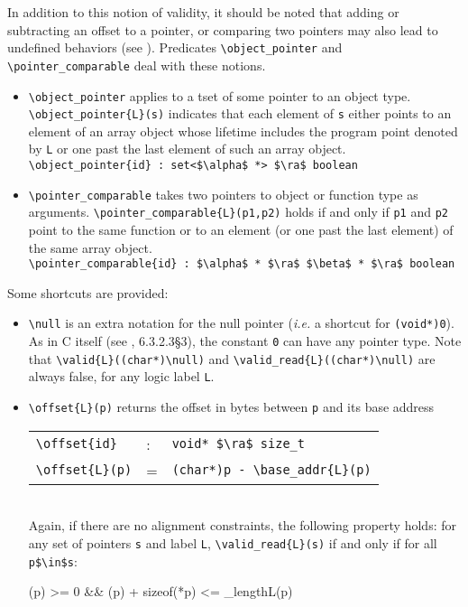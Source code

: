 In addition to this notion of validity, it should be noted that
adding or subtracting an offset to a pointer, or comparing two pointers
may also lead to undefined behaviors (see \cite[6.5.6 and 6.5.8]{standardc99}).
Predicates \lstinline|\object_pointer| and \lstinline|\pointer_comparable|
deal with these notions.
\begin{itemize}
\item \lstinline|\object_pointer| applies to a tset of
some pointer to an object type. \lstinline|\object_pointer{L}(s)| indicates that
each element of \lstinline|s| either points to an element of an array object
whose lifetime includes the program point denoted by \lstinline|L| or one past
the last element of such an array object.
\\ \makebox[5mm]{} \lstinline|\object_pointer{id} : set<$\alpha$ *> $\ra$ boolean|
\item \lstinline|\pointer_comparable| takes two pointers
to object or function type as arguments.
\lstinline|\pointer_comparable{L}(p1,p2)| holds if and only if \lstinline|p1|
and \lstinline|p2| point to the same function or to an element (or one past
the last element) of the same array object.
\\ \makebox[5mm]{} \lstinline|\pointer_comparable{id} : $\alpha$ * $\ra$ $\beta$ * $\ra$ boolean|
\end{itemize}

Some shortcuts are provided:
\begin{itemize}
\item \lstinline|\null| is an
  extra notation for the
  null pointer (\emph{i.e.} a shortcut for \lstinline|(void*)0|).
  As in C itself (see \cite{standardc99}, 6.3.2.3\S3),
  the constant \lstinline|0| can have any pointer type. Note that
  \lstinline|\valid{L}((char*)\null)| and \lstinline|\valid_read{L}((char*)\null)|
  are always false, for any
  logic label \lstinline|L|.
\item \lstinline|\offset{L}(p)|%
  returns the offset in bytes between \lstinline|p| and its base address
\\ \makebox[5mm]{} \begin{tabular}{lll}
    \lstinline|\offset{id}| &:& \lstinline|void* $\ra$ size_t| \\
    \lstinline|\offset{L}(p)| &=& \lstinline|(char*)p - \base_addr{L}(p)| \\
  \end{tabular} \\
Again, if there are no alignment constraints,
  the following property holds: for any set of pointers
\lstinline|s| and label \lstinline|L|, \lstinline|\valid_read{L}(s)| if and only if for all \lstinline|p$\in$s|:
  \begin{listing-nonumber}
    (p) >= 0 && (p) + sizeof(*p) <= \block_length{L}(p)
  \end{listing-nonumber}

\end{itemize}

